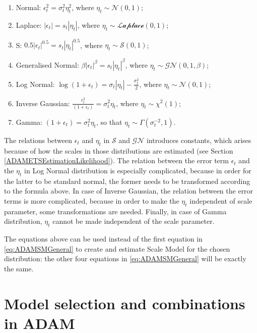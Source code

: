\documentclass[
]{book}
\providecommand{\tightlist}{%
  \setlength{\itemsep}{0pt}\setlength{\parskip}{0pt}}
\theoremstyle{definition}
\theoremstyle{definition}
\theoremstyle{definition}
\theoremstyle{definition}
\theoremstyle{remark}
\begin{document}
\begin{enumerate}
\def\labelenumi{\alph{enumi}.}
\tightlist
\item
  Normal: \(\epsilon_t^2 = \sigma_t^2 \eta_t^2\), where \(\eta_t \sim \mathcal{N}(0, 1)\);
\item
  Laplace: \(|\epsilon_t| = s_t |\eta_t|\), where \(\eta_t \sim \mathcal{Laplace}(0, 1)\);
\item
  S: \(0.5 |\epsilon_t|^{0.5} = s_t |\eta_t|^{0.5}\), where \(\eta_t \sim \mathcal{S}(0, 1)\);
\item
  Generalised Normal: \(\beta |\epsilon_t|^{\beta} = s_t |\eta_t|^{\beta}\), where \(\eta_t \sim \mathcal{GN}(0, 1, \beta)\);
\item
  Log Normal: \(\log\left(1+\epsilon_t \right) = \sigma_t |\eta_t|-\frac{\sigma_t^2}{2}\), where \(\eta_t \sim \mathcal{N}(0, 1)\);
\item
  Inverse Gaussian: \(\frac{\epsilon_t ^2}{\left(1+\epsilon_t \right)}=\sigma^2_t \eta_t\), where \(\eta_t \sim \chi^2(1)\);
\item
  Gamma: \(\left(1+\epsilon_t \right) = \sigma_t^2 \eta_t\), so that \(\eta_t \sim \mathcal{\Gamma}(\sigma_t^{-2}, 1)\).
\end{enumerate}

The relations between \(\epsilon_t\) and \(\eta_t\) in \(\mathcal{S}\) and \(\mathcal{GN}\) introduces constants, which arises because of how the scales in those distributions are estimated (see Section \ref{ADAMETSEstimationLikelihood}). The relation between the error term \(\epsilon_t\) and the \(\eta_t\) in Log Normal distribution is especially complicated, because in order for the latter to be standard normal, the former needs to be transformed according to the formula above. In case of Inverse Gaussian, the relation between the error terms is more complicated, because in order to make the \(\eta_t\) independent of scale parameter, some transformations are needed. Finally, in case of Gamma distribution, \(\eta_t\) cannot be made independent of the scale parameter.

The equations above can be used instead of the first equation in \eqref{eq:ADAMSMGeneral} to create and estimate Scale Model for the chosen distribution: the other four equations in \eqref{eq:ADAMSMGeneral} will be exactly the same.

\hypertarget{ADAMSelection}{%
\chapter{Model selection and combinations in ADAM}\label{ADAMSelection}}
\end{document}
